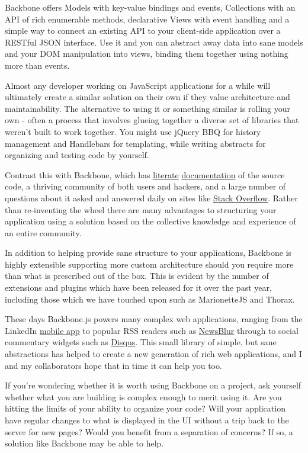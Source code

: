 \documentclass[9pt]{book}
\begin{document}
Backbone offers Models with key-value bindings and events, Collections
with an API of rich enumerable methods, declarative Views with event
handling and a simple way to connect an existing API to your client-side
application over a RESTful JSON interface. Use it and you can abstract
away data into sane models and your DOM manipulation into views, binding
them together using nothing more than events.

Almost any developer working on JavaScript applications for a while will
ultimately create a similar solution on their own if they value
architecture and maintainability. The alternative to using it or
something similar is rolling your own - often a process that involves
glueing together a diverse set of libraries that weren't built to work
together. You might use jQuery BBQ for history management and Handlebars
for templating, while writing abstracts for organizing and testing code
by yourself.

Contrast this with Backbone, which has
\href{http://en.wikipedia.org/wiki/Literate_programming}{literate}
\href{http://backbonejs.org/docs/backbone.html}{documentation} of the
source code, a thriving community of both users and hackers, and a large
number of questions about it asked and answered daily on sites like
\href{http://stackoverflow.com/search?q=backbone}{Stack Overflow}.
Rather than re-inventing the wheel there are many advantages to
structuring your application using a solution based on the collective
knowledge and experience of an entire community.

In addition to helping provide sane structure to your applications,
Backbone is highly extensible supporting more custom architecture should
you require more than what is prescribed out of the box. This is evident
by the number of extensions and plugins which have been released for it
over the past year, including those which we have touched upon such as
MarionetteJS and Thorax.

These days Backbone.js powers many complex web applications, ranging
from the LinkedIn
\href{http://touch.www.linkedin.com/mobile.html}{mobile app} to popular
RSS readers such as \href{http://newsblur.com}{NewsBlur} through to
social commentary widgets such as \href{http://disqus.com/}{Disqus}.
This small library of simple, but sane abstractions has helped to create
a new generation of rich web applications, and I and my collaborators
hope that in time it can help you too.

If you're wondering whether it is worth using Backbone on a project, ask
yourself whether what you are building is complex enough to merit using
it. Are you hitting the limits of your ability to organize your code?
Will your application have regular changes to what is displayed in the
UI without a trip back to the server for new pages? Would you benefit
from a separation of concerns? If so, a solution like Backbone may be
able to help.
\end{document}

